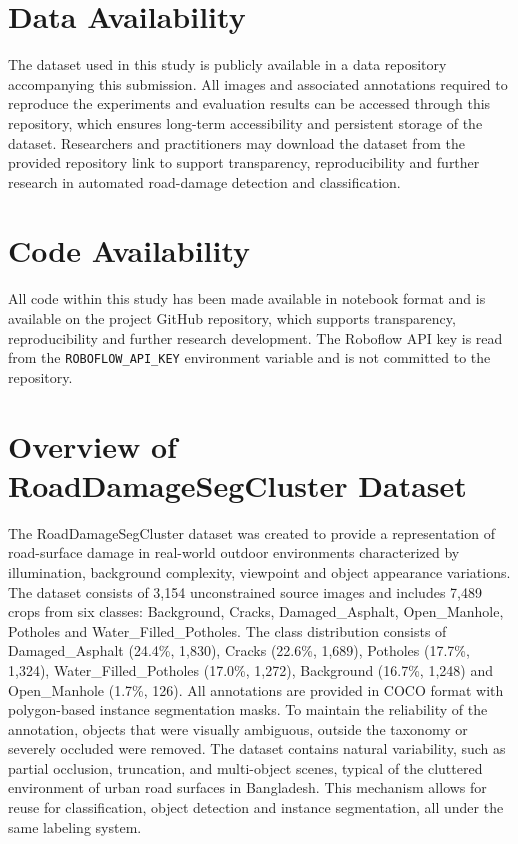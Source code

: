 \documentclass{article}
\begin{document}
\section*{Data Availability}
The dataset used in this study is publicly available in a data repository accompanying this submission. All images and associated annotations required to reproduce the experiments and evaluation results can be accessed through this repository, which ensures long-term accessibility and persistent storage of the dataset. Researchers and practitioners may download the dataset from the provided repository link to support transparency, reproducibility and further research in automated road-damage detection and classification.

\section*{Code Availability}
All code within this study has been made available in notebook format and is available on the project GitHub repository, which supports transparency, reproducibility and further research development. The Roboflow API key is read from the \texttt{ROBOFLOW\_API\_KEY} environment variable and is not committed to the repository.


\section*{Overview of RoadDamageSegCluster Dataset}
The RoadDamageSegCluster dataset was created to provide a representation of road-surface damage in real-world outdoor environments characterized by illumination, background complexity, viewpoint and object appearance variations. The dataset consists of 3{,}154 unconstrained source images and includes 7{,}489 crops from six classes: Background, Cracks, Damaged\_Asphalt, Open\_Manhole, Potholes and Water\_Filled\_Potholes. The class distribution consists of Damaged\_Asphalt (24.4\%, 1{,}830), Cracks (22.6\%, 1{,}689), Potholes (17.7\%, 1{,}324), Water\_Filled\_Potholes (17.0\%, 1{,}272), Background (16.7\%, 1{,}248) and Open\_Manhole (1.7\%, 126). All annotations are provided in COCO format with polygon-based instance segmentation masks. To maintain the reliability of the annotation, objects that were visually ambiguous, outside the taxonomy or severely occluded were removed. The dataset contains natural variability, such as partial occlusion, truncation, and multi-object scenes, typical of the cluttered environment of urban road surfaces in Bangladesh. This mechanism allows for reuse for classification, object detection and instance segmentation, all under the same labeling system.
\end{document}
